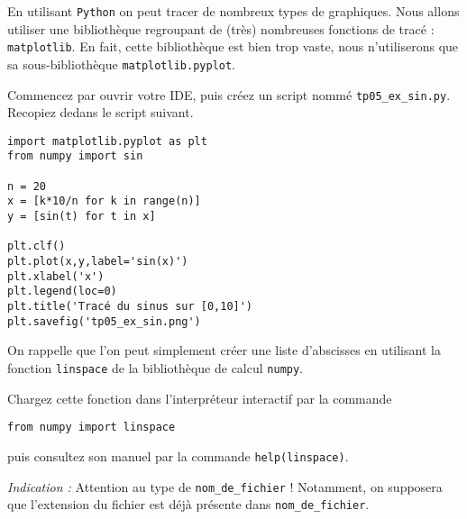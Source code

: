 
En utilisant \texttt{Python}{} on peut tracer de nombreux types de graphiques. 
Nous allons utiliser une bibliothèque regroupant de (très) nombreuses fonctions de tracé : \texttt{matplotlib}.
En fait, cette bibliothèque est bien trop vaste, nous n'utiliserons que sa sous-bibliothèque \texttt{matplotlib.pyplot}.

Commencez par ouvrir votre IDE, puis créez un script nommé \texttt{tp05\_ex\_sin.py}. Recopiez dedans le script suivant. 
\begin{lstlisting}
import matplotlib.pyplot as plt
from numpy import sin

n = 20
x = [k*10/n for k in range(n)]
y = [sin(t) for t in x]

plt.clf()
plt.plot(x,y,label='sin(x)')
plt.xlabel('x')
plt.legend(loc=0)
plt.title('Tracé du sinus sur [0,10]')
plt.savefig('tp05_ex_sin.png')
\end{lstlisting}






On rappelle que l'on peut simplement créer une liste d'abscisses en utilisant la fonction \texttt{linspace} de la bibliothèque de calcul \texttt{numpy}. 

Chargez cette fonction dans l'interpréteur interactif par la commande 
\begin{lstlisting}
from numpy import linspace
\end{lstlisting}
puis consultez son manuel par la commande \texttt{help(linspace)}. 




\emph{Indication :} Attention au type de \texttt{nom\_de\_fichier} ! Notamment, on supposera que l'extension du fichier est déjà présente dans \texttt{nom\_de\_fichier}.


